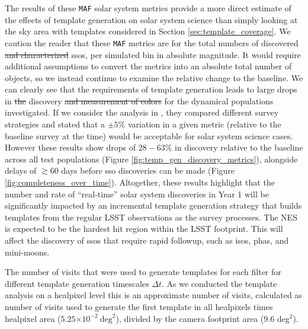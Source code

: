 \documentclass[preprintm,linenumbers]{aastex631}
\newcommand{\maf}{\texttt{MAF}\xspace}
\providecommand{\e}[1]{\ensuremath{\times 10^{#1}}}
\begin{document}
		The results of these \maf solar system metrics provide a more direct estimate of the effects of template generation on solar system science than simply looking at the sky area with templates considered in Section \ref{sec:template_coverage}. We caution the reader that these \maf metrics are for the total numbers of discovered \sout{and characterized} \glspl*{sso}, per simulated bin in absolute magnitude. It would require additional assumptions to convert the metrics into an absolute total number of objects, so we instead continue to examine the relative change to the baseline. 
		We can clearly see that the requirements of template generation leads to large drops in \sout{the} discovery \sout{and measurement of colors} for the dynamical populations investigated.
		If we consider the analysis in \cite{schwambTuningLegacySurvey2023}, they compared different survey strategies and stated that a $\pm5\%$ variation in a given metric (relative to the baseline survey at the time) would be acceptable for solar system science cases.
		However these results show drops of $28-63\%$ in discovery relative to the baseline across all test populations (Figure \ref{fig:temp_gen_discovery_metrics}), alongside delays of $\gtrsim 60$ days before \gls*{sso} discoveries can be made (Figure \ref{fig:completeness_over_time}).
		Altogether, these results highlight that the number and rate of ``real-time'' solar system discoveries in Year 1 will be significantly impacted by an incremental template generation strategy that builds templates from the regular LSST observations as the survey processes. The NES is expected to be the hardest hit region within the LSST footprint. 
		This will affect the discovery of \glspl*{sso} that require rapid followup, such as \glspl*{iso}, \glspl*{pha}, and mini-moons. 
		

		\begin{table}
			\centering
			
			\caption{
				The number of visits that were used to generate templates for each filter for different template generation timescales $\Delta t$.
				As we conducted the template analysis on a healpixel level this is an approximate number of visits, calculated as number of visits used to generate the first template in all healpixels times healpixel area ($5.25\e{-2}\ \mathrm{deg}^2$), divided by the camera footprint area (9.6 deg$^2$).
			}
			\label{tab:year1_N_visits_templates}
		\end{table}
		
		
\end{document}
